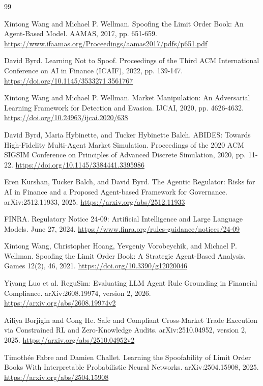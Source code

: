 \documentclass{article}
\begin{document}
\begin{thebibliography}{99}

 Xintong Wang and Michael P. Wellman. Spoofing the Limit Order Book: An Agent-Based Model. AAMAS, 2017, pp. 651-659.
\url{https://www.ifaamas.org/Proceedings/aamas2017/pdfs/p651.pdf}

 David Byrd. Learning Not to Spoof. Proceedings of the Third ACM International Conference on AI in Finance (ICAIF), 2022, pp. 139-147.
\url{https://doi.org/10.1145/3533271.3561767}

 Xintong Wang and Michael P. Wellman. Market Manipulation: An Adversarial Learning Framework for Detection and Evasion. IJCAI, 2020, pp. 4626-4632.
\url{https://doi.org/10.24963/ijcai.2020/638}

 David Byrd, Maria Hybinette, and Tucker Hybinette Balch. ABIDES: Towards High-Fidelity Multi-Agent Market Simulation. Proceedings of the 2020 ACM SIGSIM Conference on Principles of Advanced Discrete Simulation, 2020, pp. 11-22.
\url{https://doi.org/10.1145/3384441.3395986}

 Eren Kurshan, Tucker Balch, and David Byrd. The Agentic Regulator: Risks for AI in Finance and a Proposed Agent-based Framework for Governance. arXiv:2512.11933, 2025.
\url{https://arxiv.org/abs/2512.11933}

 FINRA. Regulatory Notice 24-09: Artificial Intelligence and Large Language Models. June 27, 2024.
\url{https://www.finra.org/rules-guidance/notices/24-09}

 Xintong Wang, Christopher Hoang, Yevgeniy Vorobeychik, and Michael P. Wellman. Spoofing the Limit Order Book: A Strategic Agent-Based Analysis. Games 12(2), 46, 2021.
\url{https://doi.org/10.3390/g12020046}

 Yiyang Luo et al. ReguSim: Evaluating LLM Agent Rule Grounding in Financial Compliance. arXiv:2608.19974, version 2, 2026.
\url{https://arxiv.org/abs/2608.19974v2}

 Ailiya Borjigin and Cong He. Safe and Compliant Cross-Market Trade Execution via Constrained RL and Zero-Knowledge Audits. arXiv:2510.04952, version 2, 2025.
\url{https://arxiv.org/abs/2510.04952v2}

 Timoth\'{e}e Fabre and Damien Challet. Learning the Spoofability of Limit Order Books With Interpretable Probabilistic Neural Networks. arXiv:2504.15908, 2025.
\url{https://arxiv.org/abs/2504.15908}


\end{thebibliography}
\end{document}
